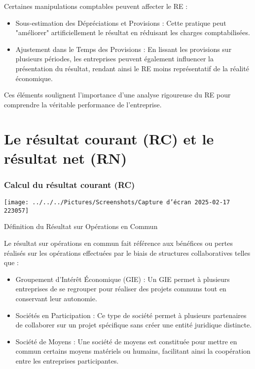 \documentclass[a4paper, 12pt]{report}
\begin{document}
Certaines manipulations comptables peuvent affecter le RE :

\begin{itemize}
	\item Sous-estimation des Dépréciations et Provisions : Cette pratique peut "améliorer" artificiellement le résultat en réduisant les charges comptabilisées.
	\item Ajustement dans le Temps des Provisions : En lissant les provisions sur plusieurs périodes, les entreprises peuvent également influencer la présentation du résultat, rendant ainsi le RE moins représentatif de la réalité économique.
\end{itemize}

Ces éléments soulignent l'importance d'une analyse rigoureuse du RE pour comprendre la véritable performance de l'entreprise.


\section{Le résultat courant (RC) et le résultat net (RN)}

\subsubsection{Calcul du résultat courant (RC)}

\begin{center}
	\texttt{[image: ../../../Pictures/Screenshots/Capture d'écran 2025-02-17 223057]}
\end{center}

Définition du Résultat sur Opérations en Commun

Le résultat sur opérations en commun fait référence aux bénéfices ou pertes réalisés sur les opérations effectuées par le biais de structures collaboratives telles que :

\begin{itemize}
	\item Groupement d'Intérêt Économique (GIE) : Un GIE permet à plusieurs entreprises de se regrouper pour réaliser des projets communs tout en conservant leur autonomie.
	\item Sociétés en Participation : Ce type de société permet à plusieurs partenaires de collaborer sur un projet spécifique sans créer une entité juridique distincte.
	\item Société de Moyens : Une société de moyens est constituée pour mettre en commun certains moyens matériels ou humains, facilitant ainsi la coopération entre les entreprises participantes.
\end{itemize}
\end{document}
